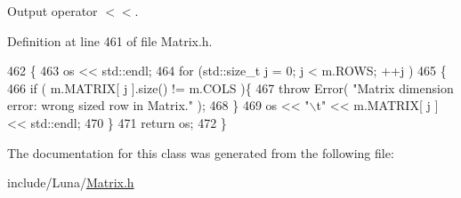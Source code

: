 Output operator $<$$<$. 



Definition at line 461 of file Matrix.\+h.


\begin{DoxyCode}
462   \{
463     os << std::endl;
464     \textcolor{keywordflow}{for} (std::size\_t j = 0; j < m.ROWS; ++j )
465     \{
466       \textcolor{keywordflow}{if} ( m.MATRIX[ j ].size() != m.COLS )\{
467         \textcolor{keywordflow}{throw} Error( \textcolor{stringliteral}{"Matrix dimension error: wrong sized row in Matrix."} );
468       \}
469       os << \textcolor{stringliteral}{"\(\backslash\)t"} << m.MATRIX[ j ] << std::endl;
470     \}
471     \textcolor{keywordflow}{return} os;
472   \}
\end{DoxyCode}


The documentation for this class was generated from the following file\+:\begin{DoxyCompactItemize}
\item 
include/\+Luna/\hyperlink{Matrix_8h}{Matrix.\+h}\end{DoxyCompactItemize}
